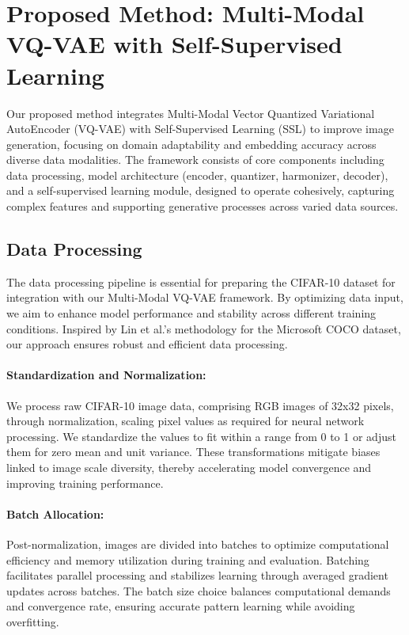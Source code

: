 \section{Proposed Method: Multi-Modal VQ-VAE with Self-Supervised Learning}

Our proposed method integrates Multi-Modal Vector Quantized Variational AutoEncoder (VQ-VAE) with Self-Supervised Learning (SSL) to improve image generation, focusing on domain adaptability and embedding accuracy across diverse data modalities. The framework consists of core components including data processing, model architecture (encoder, quantizer, harmonizer, decoder), and a self-supervised learning module, designed to operate cohesively, capturing complex features and supporting generative processes across varied data sources.

\subsection{Data Processing}

The data processing pipeline is essential for preparing the CIFAR-10 dataset for integration with our Multi-Modal VQ-VAE framework. By optimizing data input, we aim to enhance model performance and stability across different training conditions. Inspired by Lin et al.'s methodology for the Microsoft COCO dataset, our approach ensures robust and efficient data processing.

\paragraph{Standardization and Normalization:}

We process raw CIFAR-10 image data, comprising RGB images of 32x32 pixels, through normalization, scaling pixel values as required for neural network processing. We standardize the values to fit within a range from 0 to 1 or adjust them for zero mean and unit variance. These transformations mitigate biases linked to image scale diversity, thereby accelerating model convergence and improving training performance.

\paragraph{Batch Allocation:}

Post-normalization, images are divided into batches to optimize computational efficiency and memory utilization during training and evaluation. Batching facilitates parallel processing and stabilizes learning through averaged gradient updates across batches. The batch size choice balances computational demands and convergence rate, ensuring accurate pattern learning while avoiding overfitting.

